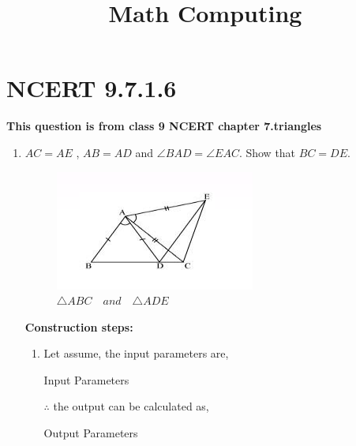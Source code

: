 \documentclass[11pt, a4paper]{article}
\title{ \textbf{Math Computing}}
\date{}
\begin{document}
\vspace{-\baselineskip}
\maketitle

\section*{NCERT 9.7.1.6}

\textbf{This question is from class 9 NCERT chapter 7.triangles}
\begin{enumerate}
\item $AC = AE$ , $AB = AD$ and $\angle BAD = \angle EAC$. Show that $BC = DE$.
	
\begin{figure}[H]
    \includegraphics[width=\columnwidth]{figs/ABCDE.png}
	\caption{$\triangle ABC \hspace{12pt} and \hspace{12pt} \triangle ADE $}
 \label{fig:fig1}
\end{figure}
\pagebreak
\textbf{Construction steps:}
\\
		\begin{enumerate}[label=(\roman*)]

\item Let assume, the input parameters are, 
\begin{table}[H]
\centering
	
	  \caption{Input Parameters}
	  \label{Table-1: }
\end{table}

$\therefore$ the output can be calculated as,
\begin{table}[H]
\centering
	
	  \caption{Output Parameters}
	  \label{Table-2: }
\end{table}


\end{enumerate}
\end{enumerate}
\end{document}
